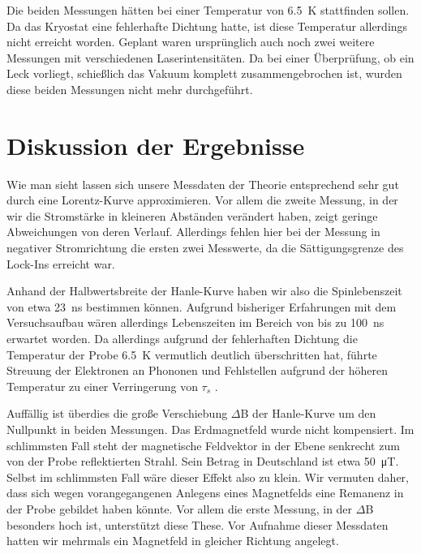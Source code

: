 \documentclass[11pt,twoside=true]{scrartcl}
\begin{document}
Die beiden Messungen hätten bei einer Temperatur von \SI{6.5}{\kelvin}
stattfinden sollen. Da das Kryostat eine fehlerhafte Dichtung hatte, ist diese
Temperatur allerdings nicht erreicht worden. Geplant waren ursprünglich auch
noch zwei weitere Messungen mit verschiedenen Laserintensitäten. Da bei einer
Überprüfung, ob ein Leck vorliegt, schießlich das Vakuum komplett
zusammengebrochen ist, wurden diese beiden Messungen nicht mehr durchgeführt.





\section{Diskussion der Ergebnisse}
Wie man sieht lassen sich unsere Messdaten der Theorie entsprechend sehr gut
durch eine Lorentz-Kurve approximieren. Vor allem die zweite Messung, in der
wir die Stromstärke in kleineren Abständen verändert haben, zeigt geringe
Abweichungen von deren Verlauf. Allerdings fehlen hier bei
der Messung in negativer Stromrichtung die ersten zwei Messwerte, da die
Sättigungsgrenze des Lock-Ins erreicht war. 

Anhand der Halbwertsbreite der Hanle-Kurve haben wir also die Spinlebenszeit
von etwa \SI{23}{\nano\second} bestimmen können. Aufgrund bisheriger
Erfahrungen mit dem Versuchsaufbau wären allerdings Lebenszeiten
im Bereich von bis zu \SI{100}{\nano\second} erwartet worden. Da allerdings
aufgrund der fehlerhaften Dichtung die Temperatur der Probe \SI{6.5}{\kelvin} 
vermutlich deutlich überschritten hat, führte Streuung der Elektronen an
Phononen und Fehlstellen aufgrund der höheren Temperatur zu einer Verringerung
von $\tau_s$ \cite{wu2010spin}.

Auffällig ist überdies die große Verschiebung
$\Delta$B der Hanle-Kurve um den Nullpunkt in beiden Messungen. 
%
Das Erdmagnetfeld wurde nicht kompensiert. Im schlimmsten Fall steht der
magnetische Feldvektor in der Ebene senkrecht zum von der Probe reflektierten
Strahl. Sein Betrag in Deutschland ist etwa \SI{50}{\micro\tesla}. Selbst im
schlimmsten Fall wäre dieser Effekt also zu klein.
%
Wir vermuten daher, dass sich wegen vorangegangenen Anlegens eines Magnetfelds
eine Remanenz in der Probe gebildet haben könnte. Vor allem die erste Messung,
in der $\Delta$B besonders hoch ist, unterstützt diese These. Vor Aufnahme
dieser Messdaten hatten wir mehrmals ein Magnetfeld in gleicher Richtung
angelegt.

\printbibliography
\end{document}
